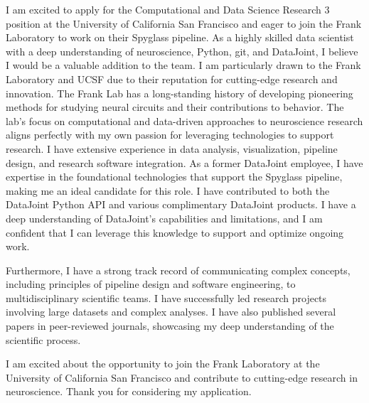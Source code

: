 \documentclass[11pt, letterpaper]{awesome-cv} %
\begin{document}
\makecvheader[C] %
\linebreak
\makelettertitle %
\begin{cvletter}
  I am excited to apply for the Computational and Data Science Research 3 position at the University of California San Francisco and eager to join the Frank Laboratory to work on their Spyglass pipeline. As a highly skilled data scientist with a deep understanding of neuroscience, Python, git, and DataJoint, I believe I would be a valuable addition to the team.
  I am particularly drawn to the Frank Laboratory and UCSF due to their reputation for cutting-edge research and innovation. The Frank Lab has a long-standing history of developing pioneering methods for studying neural circuits and their contributions to behavior. The lab's focus on computational and data-driven approaches to neuroscience research aligns perfectly with my own passion for leveraging technologies to support research.
  I have extensive experience in data analysis, visualization, pipeline design, and research software integration. As a former DataJoint employee, I have expertise in the foundational technologies that support the Spyglass pipeline, making me an ideal candidate for this role. I have contributed to both the DataJoint Python API and various complimentary DataJoint products. I have a deep understanding of DataJoint's capabilities and limitations, and I am confident that I can leverage this knowledge to support and optimize ongoing work.\par
  Furthermore, I have a strong track record of communicating complex concepts, including principles of pipeline design and software engineering, to multidisciplinary scientific teams. I have successfully led research projects involving large datasets and complex analyses. I have also published several papers in peer-reviewed journals, showcasing my deep understanding of the scientific process.\par
  I am excited about the opportunity to join the Frank Laboratory at the University of California San Francisco and contribute to cutting-edge research in neuroscience. Thank you for considering my application.
% 
% 
% 
\end{cvletter}
\makeletterclosing %
\end{document}
